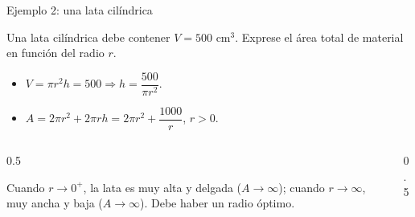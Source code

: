 \documentclass[10pt,aspectratio=169]{beamer}
\begin{document}
\begin{frame}{Ejemplo 2: una lata cilíndrica}
  \begin{ejemplo}
    Una lata cilíndrica debe contener $V=500$ cm$^3$. Exprese el área total de material en función del radio $r$.
    \begin{itemize}
      \item $V=\pi r^2h=500\Rightarrow h=\dfrac{500}{\pi r^2}$.
      \item $A=2\pi r^2+2\pi rh=2\pi r^2+\dfrac{1000}{r}$, \quad $r>0$.
    \end{itemize}
  \end{ejemplo}
  \begin{columns}
    \begin{column}{0.5\textwidth}
      \begin{observacion}
        Cuando $r\to0^+$, la lata es muy alta y delgada ($A\to\infty$); cuando $r\to\infty$, muy ancha y baja ($A\to\infty$).
        Debe haber un radio óptimo.
      \end{observacion}
    \end{column}
    \begin{column}{0.5\textwidth}
      \centering
    \end{column}
  \end{columns}
\end{frame}
\end{document}
